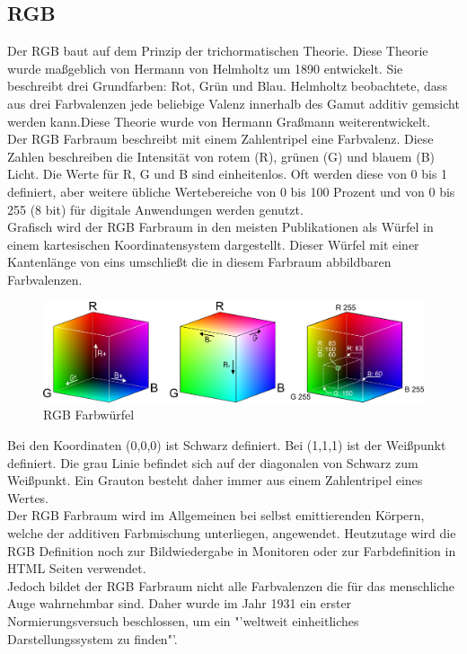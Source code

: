 \documentclass[11pt]{scrartcl}
\begin{document}
\subsection{RGB}
Der RGB baut auf dem Prinzip der trichormatischen Theorie. Diese Theorie wurde maßgeblich von Hermann von Helmholtz um 1890 entwickelt. Sie
beschreibt drei Grundfarben: Rot, Grün und Blau. Helmholtz beobachtete, dass aus drei Farbvalenzen jede beliebige Valenz innerhalb des Gamut
additiv gemsicht werden kann.Diese Theorie wurde von Hermann Graßmann weiterentwickelt.\\
Der RGB Farbraum beschreibt mit einem Zahlentripel eine Farbvalenz. Diese Zahlen beschreiben die Intensität von rotem (R), grünen (G) und
blauem (B) Licht. Die Werte für R, G und B sind einheitenlos. Oft werden diese von 0 bis 1 definiert, aber weitere übliche Wertebereiche
von 0 bis 100 Prozent und von 0 bis 255 (8 bit) für digitale Anwendungen werden genutzt. \cite{wikipediaRGB}\\
Grafisch wird der RGB Farbraum in den meisten Publikationen als Würfel in einem kartesischen Koordinatensystem dargestellt. Dieser Würfel
mit einer Kantenlänge von eins umschließt die in diesem Farbraum abbildbaren Farbvalenzen.
\begin{figure}[H]
    \includegraphics[width=\textwidth]{images/rgb_color_cube.png}
    \caption{RGB Farbwürfel \cite{wisotopRGB}}
\end{figure}
\noindent
Bei den Koordinaten (0,0,0) ist Schwarz definiert. Bei (1,1,1) ist der Weißpunkt definiert. Die grau Linie befindet sich auf der diagonalen
von Schwarz zum Weißpunkt. Ein Grauton besteht daher immer aus einem Zahlentripel eines Wertes. \cite{wisotopRGB}\\
Der RGB Farbraum wird im Allgemeinen bei selbst emittierenden Körpern, welche der additiven Farbmischung unterliegen, angewendet. Heutzutage
wird die RGB Definition noch zur Bildwiedergabe in Monitoren oder zur Farbdefinition in HTML Seiten verwendet.\\
Jedoch bildet der RGB Farbraum nicht alle Farbvalenzen die für das menschliche Auge wahrnehmbar sind. Daher wurde im Jahr 1931 ein erster
Normierungsversuch beschlossen, um ein "'weltweit einheitliches Darstellungssystem zu finden"'.\\\cite{wikipediaRGB}
\end{document}
